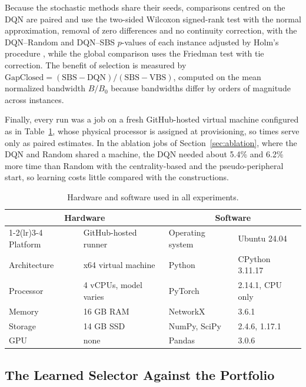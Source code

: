 \documentclass[runningheads]{llncs}
\begin{document}
Because the stochastic methods share their seeds, comparisons centred on the DQN are paired and use the two-sided Wilcoxon signed-rank test \cite{wilcoxon1945} with the normal approximation, removal of zero differences and no continuity correction, with the DQN--Random and DQN--SBS $p$-values of each instance adjusted by Holm's procedure \cite{holm1979}, while the global comparison uses the Friedman test \cite{friedman1937} with tie correction. The benefit of selection is measured by $\mathrm{GapClosed}=(\mathrm{SBS}-\mathrm{DQN})/(\mathrm{SBS}-\mathrm{VBS})$, computed on the mean normalized bandwidth $B/B_0$ because bandwidths differ by orders of magnitude across instances.

Finally, every run was a job on a fresh GitHub-hosted virtual machine configured as in Table~\ref{tab:env}, whose physical processor is assigned at provisioning, so times serve only as paired estimates. In the ablation jobs of Section~\ref{sec:ablation}, where the DQN and Random shared a machine, the DQN needed about 5.4\% and 6.2\% more time than Random with the centrality-based and the pseudo-peripheral start, so learning costs little compared with the constructions.

\begin{table}[H]
\centering
\caption{Hardware and software used in all experiments.}
\label{tab:env}
\scriptsize
\setlength{\tabcolsep}{4pt}
\begin{tabular}{llll}
\toprule
\multicolumn{2}{c}{Hardware} & \multicolumn{2}{c}{Software}\\
\cmidrule(lr){1-2}\cmidrule(lr){3-4}
Platform & GitHub-hosted runner & Operating system & Ubuntu 24.04\\
Architecture & x64 virtual machine & Python & CPython 3.11.17\\
Processor & 4 vCPUs, model varies & PyTorch & 2.14.1, CPU only\\
Memory & 16 GB RAM & NetworkX & 3.6.1\\
Storage & 14 GB SSD & NumPy, SciPy & 2.4.6, 1.17.1\\
GPU & none & Pandas & 3.0.6\\
\bottomrule
\end{tabular}
\end{table}

\subsection{The Learned Selector Against the Portfolio}
\label{sec:results}
\end{document}
